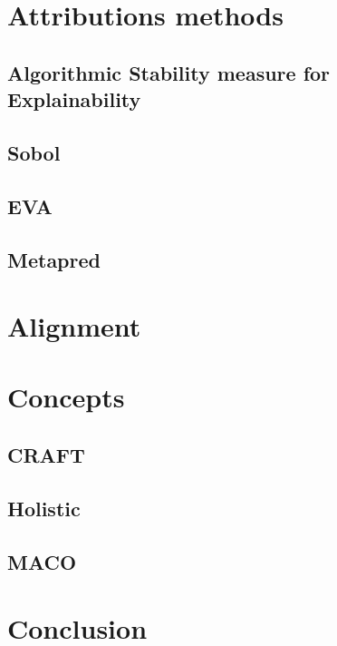\chapter{Attributions methods}

\section{Algorithmic Stability measure for Explainability}


\section{Sobol}


\section{EVA}


\section{Metapred}


\chapter{Alignment}


\chapter{Concepts}

\section{CRAFT}


\section{Holistic}


\section{MACO}


\chapter{Conclusion}

